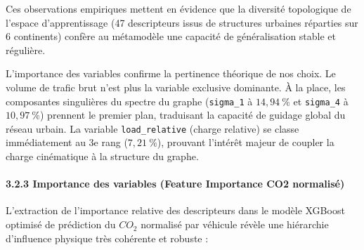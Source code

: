 \documentclass[10pt, a4paper]{article}
\begin{document}
Ces observations empiriques mettent en évidence que la diversité
topologique de l'espace d'apprentissage (47 descripteurs issus de
structures urbaines réparties sur 6 continents) confère au métamodèle
une capacité de généralisation stable et régulière.

L'importance des variables confirme la pertinence théorique de nos
choix. Le volume de trafic brut n'est plus la variable exclusive
dominante. À la place, les composantes singulières du spectre du graphe
(\texttt{sigma\_1} à \(14,94\ \%\) et \texttt{sigma\_4} à \(10,97\ \%\))
prennent le premier plan, traduisant la capacité de guidage global du
réseau urbain. La variable \texttt{load\_relative} (charge relative) se
classe immédiatement au 3e rang (\(7,21\ \%\)), prouvant l'intérêt
majeur de coupler la charge cinématique à la structure du graphe.

\newpage

\paragraph{3.2.3 Importance des variables (Feature Importance CO2
normalisé)}\label{importance-des-variables-feature-importance-co2-normalisuxe9}

L'extraction de l'importance relative des descripteurs dans le modèle
XGBoost optimisé de prédiction du \(CO_2\) normalisé par véhicule révèle
une hiérarchie d'influence physique très cohérente et robuste :
\end{document}
